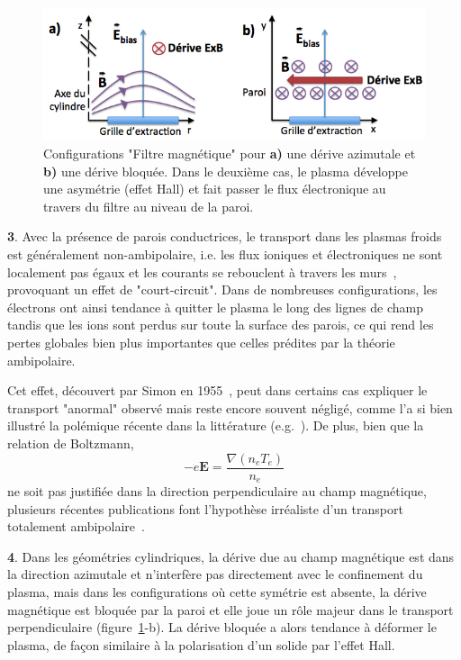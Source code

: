 \begin{refsection}
\begin{figure}[htbp]
\centering
\includegraphics[width=\textwidth]{figures/derives.png}
{\caption{Configurations "Filtre magnétique" pour
\textbf{a)} une dérive azimutale et \textbf{b)} une dérive
bloquée. Dans le deuxième cas, le plasma développe une
asymétrie (effet Hall) et fait passer le flux
électronique au travers du filtre au niveau de la
paroi.}\label{Contextederive}}
\end{figure}

\textbf{3}. Avec la présence de parois conductrices, le transport dans les
plasmas froids est généralement non-ambipolaire, i.e. les flux ioniques et
électroniques ne sont localement pas égaux et les courants se rebouclent à
travers les murs~\parencite{Rozhansky}, provoquant un effet de "court-circuit".
Dans de nombreuses configurations, les électrons ont ainsi tendance à quitter
le plasma le long des lignes de champ tandis que les ions sont perdus sur toute
la surface des parois, ce qui rend les pertes globales bien plus importantes
que celles prédites par la théorie ambipolaire.

Cet effet, découvert par Simon en 1955~\parencite{Simon55}, peut dans certains
cas expliquer le transport "anormal" observé mais reste encore souvent négligé,
comme l'a si bien illustré la polémique récente dans la littérature
(e.g.~\parencite{Fruchtman,Simon08,Fruchtman08}). De plus, bien que la relation
de Boltzmann,
\begin{equation}
-e\mathbf
E =\frac{\nabla (n_e T_e)}{n_e}
\end{equation}
ne soit pas justifiée dans la direction perpendiculaire au champ magnétique,
plusieurs récentes publications font l'hypothèse irréaliste d'un transport
totalement ambipolaire~\parencite{Fruchtman,Nasi}.
\vspace{1cm}

\textbf{4}. Dans les géométries cylindriques, la dérive due au champ magnétique
est dans la direction azimutale et n'interfère pas directement avec le
confinement du plasma, mais dans les
configurations où cette symétrie est absente, la dérive magnétique est bloquée
par la paroi et elle joue un rôle majeur dans le transport perpendiculaire
(figure~\ref{Contextederive}-b). La dérive bloquée a alors tendance à déformer
le plasma, de façon similaire à la polarisation d'un solide par l'effet Hall.


\end{refsection}
